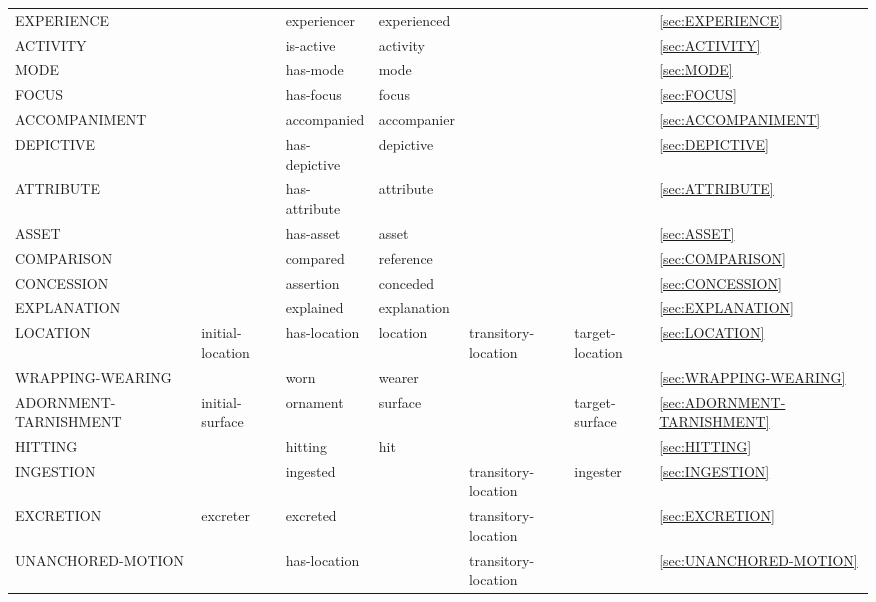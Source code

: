 \documentclass[a4paper]{article}
\newcommand{\fr}[1]{\textsf{#1}}
\newcommand{\rl}[1]{\textsf{#1}}
\newcommand{\boro}{\RowStyle{\bfseries}}
\begin{document}
\begin{table}
{\begin{NiceTabular}{lllllll}
            \boro\fr{EXPERIENCE} & & \rl{experiencer} & \rl{experienced} & & & \ref{sec:EXPERIENCE} \\
            \boro\fr{ACTIVITY} & & \rl{is-active} & \rl{activity} & & & \ref{sec:ACTIVITY} \\
            \boro\fr{MODE} & & \rl{has-mode} & \rl{mode} & & & \ref{sec:MODE} \\
            \boro\fr{FOCUS} & & \rl{has-focus} & \rl{focus} & & & \ref{sec:FOCUS} \\
            \midrule
            \boro\fr{ACCOMPANIMENT} & & \rl{accompanied} & \rl{accompanier} & & & \ref{sec:ACCOMPANIMENT} \\
            \fr{DEPICTIVE} & & \rl{has-depictive} & \rl{depictive} & & & \ref{sec:DEPICTIVE} \\
            \boro\fr{ATTRIBUTE} & & \rl{has-attribute} & \rl{attribute} & & & \ref{sec:ATTRIBUTE} \\
            \boro\fr{ASSET} & & \rl{has-asset} & \rl{asset} & & & \ref{sec:ASSET} \\
            \boro\fr{COMPARISON} & & \rl{compared} & \rl{reference} & & & \ref{sec:COMPARISON} \\
            \fr{CONCESSION} & & \rl{assertion} & \rl{conceded} & & & \ref{sec:CONCESSION} \\
            \boro\fr{EXPLANATION} & & \rl{explained} & \rl{explanation} & & & \ref{sec:EXPLANATION} \\
            \boro\fr{LOCATION} & \rl{initial-location} & \rl{has-location} & \rl{location} & \rl{transitory-location} & \rl{target-location} & \ref{sec:LOCATION} \\
            \fr{WRAPPING-WEARING} & & \rl{worn} & \rl{wearer} & & & \ref{sec:WRAPPING-WEARING} \\
            \fr{ADORNMENT-TARNISHMENT} & \rl{initial-surface} & \rl{ornament} & \rl{surface} & & \rl{target-surface} & \ref{sec:ADORNMENT-TARNISHMENT} \\
            \fr{HITTING} & & \rl{hitting} & \rl{hit} & & & \ref{sec:HITTING} \\
            \fr{INGESTION} & & \rl{ingested} & & \rl{transitory-location} & \rl{ingester} & \ref{sec:INGESTION} \\
            \fr{EXCRETION} & \rl{excreter} & \rl{excreted} & & \rl{transitory-location} & & \ref{sec:EXCRETION} \\
            \fr{UNANCHORED-MOTION} & & \rl{has-location} & & \rl{transitory-location} & & \ref{sec:UNANCHORED-MOTION} \\

\end{NiceTabular}}
\end{table}
\end{document}
